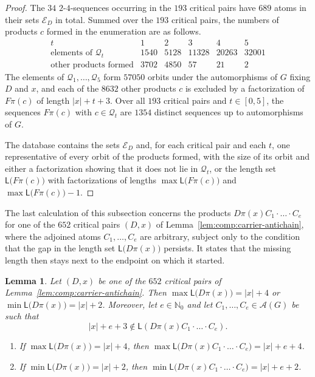 \documentclass[a4paper, 10pt]{amsart}
\theoremstyle{plain}
\newtheorem{lemma}[theorem]{\bf Lemma}
\theoremstyle{definition}
\theoremstyle{definition}
\newcommand{\N}{\mathbb N}
\newcommand{\code}[1]{\texttt{\detokenize{#1}}}
\numberwithin{equation}{section}
\begin{document}
\begin{proof}
The $34$ $2$-$4$-sequences occurring in the $193$ critical pairs have $689$
atoms in their sets $\mathcal E_D$ in total.  Summed over the $193$ critical
pairs, the numbers of products $c$ formed in the enumeration are as follows.
\[
\begin{array}{l|ccccc}
 t & 1 & 2 & 3 & 4 & 5\\ \hline
 \text{elements of } \mathcal Q_t & 1540 & 5128 & 11328 & 20263 & 32001\\
 \text{other products formed} & 3702 & 4850 & 57 & 21 & 2
\end{array}
\]
The elements of $\mathcal Q_1, \ldots, \mathcal Q_5$ form $57050$ orbits under
the automorphisms of $G$ fixing $D$ and $x$, and each of the $8632$ other
products $c$ is excluded by a factorization of $F\pi(c)$ of length $|x|+t+3$.
Over all $193$ critical pairs and $t \in [0,5]$, the sequences $F\pi(c)$ with
$c \in \mathcal Q_t$ are $1354$ distinct sequences up to automorphisms of $G$.

The database \code{bounded-endpoint.jsonl} contains the sets $\mathcal E_D$
and, for each critical pair and each $t$, one representative of every orbit of
the products formed, with the size of its orbit and either a factorization
showing that it does not lie in $\mathcal Q_t$, or the length set
$\mathsf L \big( F\pi(c) \big)$ with factorizations of lengths
$\max \mathsf L \big( F\pi(c) \big)$ and $\max \mathsf L \big( F\pi(c) \big) - 1$.
\end{proof}

The last calculation of this subsection concerns the products
$D\pi(x) C_1 \cdot \ldots \cdot C_e$ for one of the $652$
critical pairs $(D,x)$ of Lemma~\ref{lem:comp:carrier-antichain}, where the
adjoined atoms $C_1, \ldots, C_e$ are arbitrary, subject only to the
condition that the gap in the length set  $\mathsf L \big( D\pi(x) \big)$ persists.  It states that the
missing length then stays next to the endpoint on which it started.

\begin{lemma} \label{lem:comp:extensions}
Let $(D,x)$ be one of the $652$ critical pairs of
Lemma~\ref{lem:comp:carrier-antichain}.  Then
$\max \mathsf L \big( D\pi(x) \big) = |x|+4$ or $\min \mathsf L \big( D\pi(x) \big) = |x|+2$.
Moreover, let $e \in \N_0$ and let $C_1, \ldots, C_e \in \mathcal A (G)$ be
such that
\[
 |x|+e+3 \notin \mathsf L (D\pi(x) C_1 \cdot \ldots \cdot C_e) .
\]
\begin{enumerate}
\item If $\max \mathsf L \big( D\pi(x) \big) = |x|+4$, then
      $\max \mathsf L \big(D\pi(x) C_1 \cdot \ldots \cdot C_e \big) = |x|+e+4$.
      
\item If $\min \mathsf L \big( D\pi(x) \big) = |x|+2$, then
      $\min \mathsf L \big( D\pi(x) C_1 \cdot \ldots \cdot C_e \big) = |x|+e+2$.
\end{enumerate}
\end{lemma}
\end{document}

